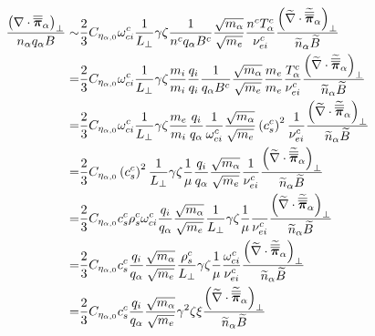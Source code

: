 \begin{align*}
    \frac{\left(\nabla\cdot\boldsymbol{\overline{\overline{\pi}}}_\alpha\right)_\perp}{n_\alpha q_\alpha B}
    \sim&
    \frac{2}{3}
    C_{\eta_{\alpha,0}}
     \omega^c_{ci}
     \frac{1}{L_\perp}
     \gamma
     \zeta
     \frac{1}{n^c q_\alpha B^c}
     \frac{\sqrt{m_\alpha}}{\sqrt{m_e}}
     \frac{n^c T^c_\alpha}{\nu^c_{ei}}
     \frac{ \left(\widetilde{ \nabla}\cdot\widetilde{ \boldsymbol{\overline{\overline{\pi}}}}_\alpha\right)_\perp }{\widetilde{ n}_\alpha \widetilde{ B}}
     \\
     =&
    \frac{2}{3}
    C_{\eta_{\alpha,0}}
     \omega^c_{ci}
     \frac{1}{L_\perp}
     \gamma
     \zeta
     \frac{m_i}{m_i}
     \frac{q_i}{q_i}
     \frac{1}{q_\alpha B^c}
     \frac{\sqrt{m_\alpha}}{\sqrt{m_e}}
     \frac{m_e}{m_e}
     \frac{T^c_\alpha}{\nu^c_{ei}}
     \frac{ \left(\widetilde{ \nabla}\cdot\widetilde{ \boldsymbol{\overline{\overline{\pi}}}}_\alpha\right)_\perp }{\widetilde{ n}_\alpha \widetilde{ B}}
     \\
     =&
    \frac{2}{3}
    C_{\eta_{\alpha,0}}
     \omega^c_{ci}
     \frac{1}{L_\perp}
     \gamma
     \zeta
     \frac{m_e}{m_i}
     \frac{q_i}{q_\alpha}
     \frac{1}{\omega^c_{ci}}
     \frac{\sqrt{m_\alpha}}{\sqrt{m_e}}
     \left(c^c_s\right)^2
     \frac{1}{\nu^c_{ei}}
     \frac{ \left(\widetilde{ \nabla}\cdot\widetilde{ \boldsymbol{\overline{\overline{\pi}}}}_\alpha\right)_\perp }{\widetilde{ n}_\alpha \widetilde{ B}}
     \\
     =&
    \frac{2}{3}
    C_{\eta_{\alpha,0}}
    \left(c^c_s\right)^2
     \frac{1}{L_\perp}
     \gamma
     \zeta
     \frac{1}{\mu}
     \frac{q_i}{q_\alpha}
     \frac{\sqrt{m_\alpha}}{\sqrt{m_e}}
     \frac{1}{\nu^c_{ei}}
     \frac{ \left(\widetilde{ \nabla}\cdot\widetilde{ \boldsymbol{\overline{\overline{\pi}}}}_\alpha\right)_\perp }{\widetilde{ n}_\alpha \widetilde{ B}}
     \\
     =&
    \frac{2}{3}
    C_{\eta_{\alpha,0}}
     c^c_s
     \rho^c_s
     \omega^c_{ci}
     \frac{q_i}{q_\alpha}
     \frac{\sqrt{m_\alpha}}{\sqrt{m_e}}
     \frac{1}{L_\perp}
     \gamma
     \zeta
     \frac{1}{\mu}
     \frac{}{\nu^c_{ei}}
     \frac{ \left(\widetilde{ \nabla}\cdot\widetilde{ \boldsymbol{\overline{\overline{\pi}}}}_\alpha\right)_\perp }{\widetilde{ n}_\alpha \widetilde{ B}}
     \\
     =&
    \frac{2}{3}
    C_{\eta_{\alpha,0}}
     c^c_s
     \frac{q_i}{q_\alpha}
     \frac{\sqrt{m_\alpha}}{\sqrt{m_e}}
     \frac{\rho^c_s}{L_\perp}
     \gamma
     \zeta
     \frac{1}{\mu}
     \frac{\omega^c_{ci}}{\nu^c_{ei}}
     \frac{ \left(\widetilde{ \nabla}\cdot\widetilde{ \boldsymbol{\overline{\overline{\pi}}}}_\alpha\right)_\perp }{\widetilde{ n}_\alpha \widetilde{ B}}
     \\
     =&
    \frac{2}{3}
    C_{\eta_{\alpha,0}}
     c^c_s
     \frac{q_i}{q_\alpha}
     \frac{\sqrt{m_\alpha}}{\sqrt{m_e}}
     \gamma^2
     \zeta
     \xi
     \frac{ \left(\widetilde{ \nabla}\cdot\widetilde{ \boldsymbol{\overline{\overline{\pi}}}}_\alpha\right)_\perp }{\widetilde{ n}_\alpha \widetilde{ B}}
\end{align*}
%

